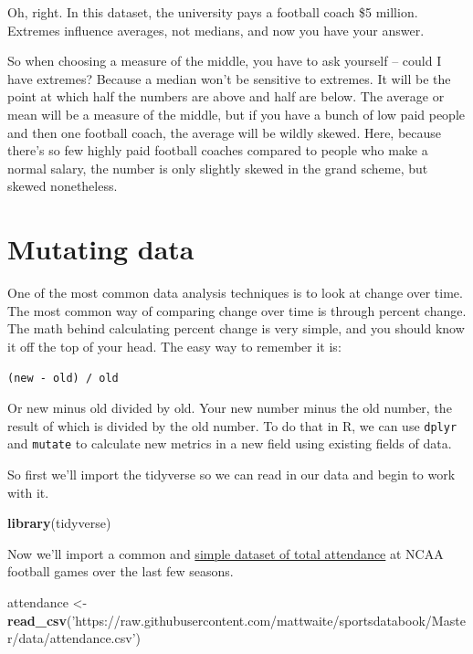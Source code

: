 \documentclass[]{book}
\newenvironment{Shaded}{\begin{snugshade}}{\end{snugshade}}
\newcommand{\KeywordTok}[1]{\textcolor[rgb]{0.13,0.29,0.53}{\textbf{#1}}}
\newcommand{\StringTok}[1]{\textcolor[rgb]{0.31,0.60,0.02}{#1}}
\newcommand{\NormalTok}[1]{#1}
\begin{document}
Oh, right. In this dataset, the university pays a football coach \$5
million. Extremes influence averages, not medians, and now you have your
answer.

So when choosing a measure of the middle, you have to ask yourself --
could I have extremes? Because a median won't be sensitive to extremes.
It will be the point at which half the numbers are above and half are
below. The average or mean will be a measure of the middle, but if you
have a bunch of low paid people and then one football coach, the average
will be wildly skewed. Here, because there's so few highly paid football
coaches compared to people who make a normal salary, the number is only
slightly skewed in the grand scheme, but skewed nonetheless.

\chapter{Mutating data}\label{mutating-data}

One of the most common data analysis techniques is to look at change
over time. The most common way of comparing change over time is through
percent change. The math behind calculating percent change is very
simple, and you should know it off the top of your head. The easy way to
remember it is:

\texttt{(new\ -\ old)\ /\ old}

Or new minus old divided by old. Your new number minus the old number,
the result of which is divided by the old number. To do that in R, we
can use \texttt{dplyr} and \texttt{mutate} to calculate new metrics in a
new field using existing fields of data.

So first we'll import the tidyverse so we can read in our data and begin
to work with it.

\begin{Shaded}
\begin{Highlighting}[]
\KeywordTok{library}\NormalTok{(tidyverse)}
\end{Highlighting}
\end{Shaded}

Now we'll import a common and
\href{https://unl.box.com/s/hvxmnxhr41x4ikgt3vk38aczcbrf97pn}{simple
dataset of total attendance} at NCAA football games over the last few
seasons.

\begin{Shaded}
\begin{Highlighting}[]
\NormalTok{attendance <-}\StringTok{ }\KeywordTok{read_csv}\NormalTok{(}\StringTok{'https://raw.githubusercontent.com/mattwaite/sportsdatabook/Master/data/attendance.csv'}\NormalTok{)}
\end{Highlighting}
\end{Shaded}
\end{document}
